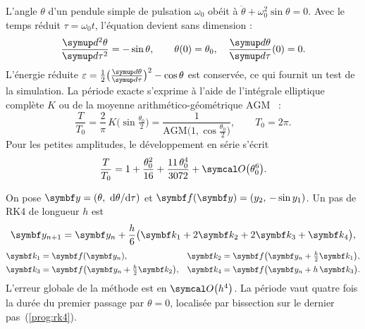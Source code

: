 \begin{modele}
L'angle $\theta$ d'un pendule simple de pulsation $\omega_{0}$ obéit à
$\ddot\theta+\omega_{0}^{2}\sin\theta=0$. Avec le temps réduit
$\tau=\omega_{0}t$, l'équation devient sans dimension :
\begin{equation}
  \dv[2]{\theta}{\tau} = -\sin\theta,
  \qquad \theta(0)=\theta_{0},\quad \dv{\theta}{\tau}(0)=0 .
  \label{eq:pendule}
\end{equation}
L'énergie réduite $\varepsilon=\tfrac12\bigl(\dv{\theta}{\tau}\bigr)^{2}-\cos\theta$
est conservée, ce qui fournit un test de la simulation. La période exacte
s'exprime à l'aide de l'intégrale elliptique complète $K$ ou de la
moyenne arithmético-géométrique $\mathrm{AGM}$~\cite{landau1976} :
\begin{equation}
  \frac{T}{T_{0}}=\frac{2}{\pi}\,K\bigl(\sin\tfrac{\theta_{0}}{2}\bigr)
  =\frac{1}{\mathrm{AGM}\bigl(1,\cos\tfrac{\theta_{0}}{2}\bigr)},
  \qquad T_{0}=2\pi .
  \label{eq:exacte}
\end{equation}
Pour les petites amplitudes, le développement en série s'écrit
\begin{equation}
  \frac{T}{T_{0}}=1+\frac{\theta_{0}^{2}}{16}+\frac{11\,\theta_{0}^{4}}{3072}
  +\bigO{\theta_{0}^{6}} .
  \label{eq:serie}
\end{equation}
\end{modele}

\begin{methode}
On pose $\vect{y}=(\theta,\ \mathrm{d}\theta/\mathrm{d}\tau)$ et
$\vect{f}(\vect{y})=(y_{2},\,-\sin y_{1})$. Un pas de RK4 de longueur $h$ est
\begin{equation}
  \vect{y}_{n+1}=\vect{y}_{n}+\frac{h}{6}\bigl(\vect{k}_{1}+2\vect{k}_{2}+2\vect{k}_{3}+\vect{k}_{4}\bigr),
  \label{eq:rk4}
\end{equation}
\begin{align}
  \vect{k}_{1}&=\vect{f}(\vect{y}_{n}),
  &\vect{k}_{2}&=\vect{f}\bigl(\vect{y}_{n}+\tfrac{h}{2}\vect{k}_{1}\bigr),\notag\\
  \vect{k}_{3}&=\vect{f}\bigl(\vect{y}_{n}+\tfrac{h}{2}\vect{k}_{2}\bigr),
  &\vect{k}_{4}&=\vect{f}\bigl(\vect{y}_{n}+h\,\vect{k}_{3}\bigr).
\end{align}
L'erreur globale de la méthode est en $\bigO{h^{4}}$. La période vaut quatre
fois la durée du premier passage par $\theta=0$, localisée par bissection sur le
dernier pas~(\cref{prog:rk4}).
\end{methode}

